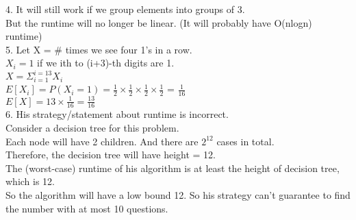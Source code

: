 \documentclass[12pt]{article}
\begin{document}
4. It will still work if we group elements into groups of 3.\\
But the runtime will no longer be linear. (It will probably have O(nlogn) runtime)\\


5.  Let X = $\#$ times we see four 1's in a row.\\
$X_i = 1$  if we ith to (i+3)-th digits are 1.\\

$X = \Sigma^{i=13}_{i=1} X_i$\\

$E[X_i] = P(X_i = 1) = \frac{1}{2}\times\frac{1}{2}\times\frac{1}{2}\times\frac{1}{2}$  = $\frac{1}{16}$\\
$E[X] = 13 \times \frac{1}{16} = \frac{13}{16}$\\

6. His strategy/statement about runtime is incorrect.\\
Consider a decision tree for this problem.\\
Each node will have 2 children. And there are $2^12$ cases in total.\\
Therefore, the decision tree will have height = 12.\\
The (worst-case) runtime of his algorithm is at least the height of decision tree, which is 12.\\
So the algorithm will have a low bound 12. So his  strategy can't guarantee  to find the number with at most 10 questions.\\
\end{document}
